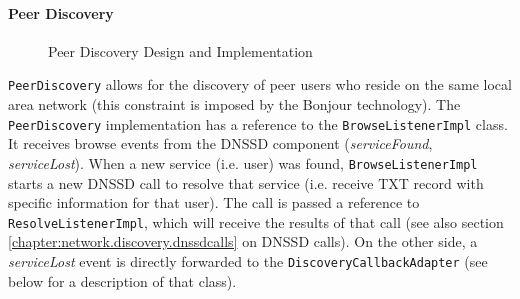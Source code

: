 \paragraph{Peer Discovery}
\begin{figure}[H]
 \centering
 \caption{Peer Discovery Design and Implementation}
 \label{fig:network.discovery.peerdiscovery}
\end{figure}

\texttt{PeerDiscovery} allows for the discovery of peer users who reside on the same local area network (this constraint is   imposed by the Bonjour technology). The \texttt{PeerDiscovery} implementation has a reference to the \texttt{BrowseListenerImpl} class. It receives browse events from the DNSSD component (\emph{serviceFound}, \emph{serviceLost}). When a new service (i.e. user) was found, \texttt{BrowseListenerImpl} starts a new DNSSD call to resolve that service (i.e. receive TXT record with specific information for that user). The call is passed a reference to \texttt{ResolveListenerImpl}, which will receive the results of that call (see also section \ref{chapter:network.discovery.dnssdcalls} on DNSSD calls). On the other side, a \emph{serviceLost} event is directly forwarded to the \texttt{DiscoveryCallbackAdapter} (see below for a description of that class). 

